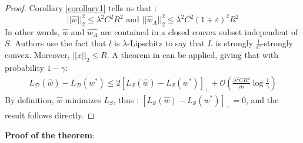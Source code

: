 \documentclass{article}
\begin{document}
    \begin{proof}
        Corollary \ref{corollary1} tells us that :
        \[
            ||\hat{w}||_2^2 
            \leq \lambda^2 C^2 R^2 \text{ and }
            ||\hat{w}_A||_2^2 
            \leq \lambda^2 C^2 (1+\varepsilon)^2 R^2
        \]
        In other words, $\hat{w}$ and $\hat{w_A}$ are contained 
        in a closed convex subset independent of $S$. Authors use the 
        fact that $l$ is $\lambda$-Lipschitz to say that $L$ is strongly 
        $\frac{1}{C}$-strongly convex. Moreover, $||x||_2 \leq R$. 
        A theorem in \cite{NIPS2008_3400} can be applied, giving that
        with probability $1-\gamma$:
        \begin{align*}
            L_{\mathcal{D}}(\hat{w}) - L_{\mathcal{D}}(w^*) 
            \leq 2 [L_{\mathcal{S}}(\hat{w}) - L_{\mathcal{S}}(w^*)]_+ 
            + \mathcal{O}\left( \frac{\lambda^2C R^2}{m} \log \frac{1}{\gamma}  \right)
        \end{align*} 
        By definition, $\hat{w}$ minimizes $L_S$, thus :
        $[L_{\mathcal{S}}(\hat{w}) - L_{\mathcal{S}}(w^*)]_+  = 0$, and the result follows 
        directly. 
    \end{proof}
\textbf{Proof of the theorem}:
\end{document}
